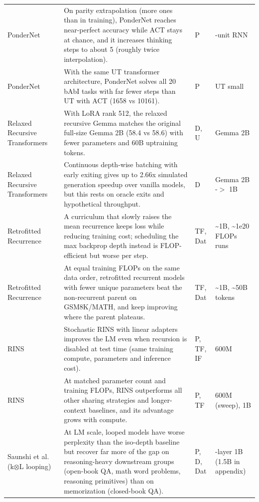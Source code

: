 \begin{longtable}{@{}>{\raggedright\arraybackslash}p{2.7cm}>{\raggedright\arraybackslash}p{7.9cm}>{\raggedright\arraybackslash}p{1.3cm}>{\raggedright\arraybackslash}p{2.5cm}@{}}
PonderNet~\citep{ax2107.05407} & On parity extrapolation (more ones than in training), PonderNet reaches near-perfect accuracy while ACT stays at chance, and it increases thinking steps to about 5 (roughly twice interpolation). & P & 128-unit RNN \\
PonderNet~\citep{ax2107.05407} & With the same UT transformer architecture, PonderNet solves all 20 bAbI tasks with far fewer steps than UT with ACT (1658 vs 10161). & P & UT small \\
Relaxed Recursive Transformers~\citep{ax2410.20672} & With LoRA rank 512, the relaxed recursive Gemma matches the original full-size Gemma 2B (58.4 vs 58.6) with fewer parameters and 60B uptraining tokens. & D, U & Gemma 2B \\
Relaxed Recursive Transformers~\citep{ax2410.20672} & Continuous depth-wise batching with early exiting gives up to 2.66x simulated generation speedup over vanilla models, but this rests on oracle exits and hypothetical throughput. & D & Gemma 2B -$>$ 1B \\
Retrofitted Recurrence~\citep{ax2511.07384} & A curriculum that slowly raises the mean recurrence keeps loss while reducing training cost; scheduling the max backprop depth instead is FLOP-efficient but worse per step. & TF, Dat & \textasciitilde{}1B, \textasciitilde{}1e20 FLOPs runs \\
Retrofitted Recurrence~\citep{ax2511.07384} & At equal training FLOPs on the same data order, retrofitted recurrent models with fewer unique parameters beat the non-recurrent parent on GSM8K/MATH, and keep improving where the parent plateaus. & TF, Dat & \textasciitilde{}1B, \textasciitilde{}50B tokens \\
RINS~\citep{ax2502.07503} & Stochastic RINS with linear adapters improves the LM even when recursion is disabled at test time (same training compute, parameters and inference cost). & P, TF, IF & 600M \\
RINS~\citep{ax2502.07503} & At matched parameter count and training FLOPs, RINS outperforms all other sharing strategies and longer-context baselines, and its advantage grows with compute. & P, TF & 600M (sweep), 1B \\
Saunshi et al. (k$\otimes$L looping)~\citep{ax2502.17416} & At LM scale, looped models have worse perplexity than the iso-depth baseline but recover far more of the gap on reasoning-heavy downstream groups (open-book QA, math word problems, reasoning primitives) than on memorization (closed-book QA). & P, D, Dat & 24-layer 1B (1.5B in appendix) \\

\end{longtable}
